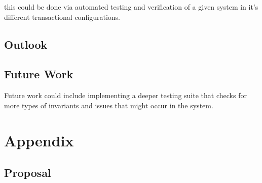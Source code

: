 \documentclass[a4paper,10pt,titlepage]{report}
\begin{document}
this could be done via automated testing and verification of a given system in it's different transactional configurations.

    \section*{Outlook}


    \section{Future Work}
    Future work could include implementing a deeper testing suite that checks for more types of invariants and issues that might occur in the system.





    \newpage


    \chapter{Appendix}

    \pagestyle{empty}
    \printbibliography


    \section{Proposal}
    



\end{document}
